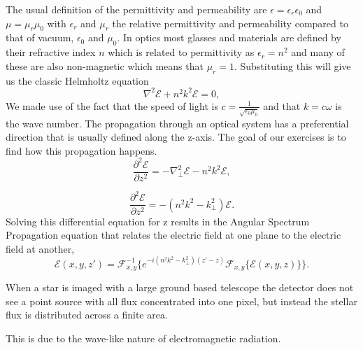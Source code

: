\documentclass[letterpaper]{ar-1col}
\begin{document}
The usual definition of the permittivity and permeability are $\epsilon=\epsilon_r \epsilon_0$ and $\mu=\mu_r \mu_0$ with $\epsilon_r$ and $\mu_r$ the relative permittivity and permeability compared to that of vacuum, $\epsilon_0$ and $\mu_0$. In optics most glasses and materials are defined by their refractive index $n$ which is related to permittivity as $\epsilon_r = n^2$ and many of these are also non-magnetic which means that $\mu_r=1$. Substituting this will give us the classic Helmholtz equation
\begin{equation}
\nabla^2\mathcal{E} + n^2k^2 \mathcal{E} = 0,
\end{equation}
We made use of the fact that the speed of light is $c = \frac{1}{\sqrt{\epsilon_0\mu_0}}$ and that $k = c\omega$ is the wave number. The propagation through an optical system has a preferential direction that is usually defined along the z-axis. The goal of our exercises is to find how this propagation happens. 
\begin{equation}
\frac{\partial^2\mathcal{E}}{\partial z^2} = -\nabla_{\perp}^2\mathcal{E}-n^2k^2 \mathcal{E},
\end{equation}

\begin{equation}
\frac{\partial^2\mathcal{E}}{\partial z^2} = -(n^2k^2 - k_{\perp}^2)\mathcal{E}.
\end{equation}
Solving this differential equation for z results in the Angular Spectrum Propagation equation that relates the electric field at one plane to the electric field at another,
\begin{equation}
\mathcal{E}(x, y, z') = \mathcal{F}_{x,y}^{-1}\{e^{-i(n^2k^2 - k_{\perp}^2)(z'-z)}\mathcal{F}_{x,y}\{\mathcal{E}(x,y,z)\}\}.
\end{equation}



When a star is imaged with a large ground based telescope the detector does not see a point source with all flux concentrated into one pixel, but instead the stellar flux is distributed across a finite area.%

%
This is due to the wave-like nature of electromagnetic radiation.
\end{document}
